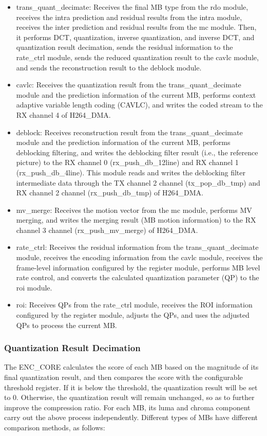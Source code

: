 \documentclass[main\_\_EN.tex]{subfiles}
\begin{document}
\begin{itemize}
    \item trans\_quant\_decimate: Receives the final MB type from the rdo module, receives the intra prediction and residual results from the intra module, receives the inter prediction and residual results from the mc module. Then, it performs DCT, quantization, inverse quantization, and inverse DCT, and quantization result decimation, sends the residual information to the rate\_ctrl module, sends the reduced quantization result to the cavlc module, and sends the reconstruction result to the deblock module.
    \item cavlc: Receives the quantization result from the trans\_quant\_decimate module and the prediction information of the current MB, performs context adaptive variable length coding (CAVLC), and writes the coded stream to the RX channel 4 of H264\_DMA.
    \item deblock: Receives reconstruction result from the trans\_quant\_decimate module and the prediction information of the current MB, performs deblocking filtering, and writes the deblocking filter result (i.e., the reference picture) to the RX channel 0 (rx\_push\_db\_12line) and RX channel 1 (rx\_push\_db\_4line). This module reads and writes the deblocking filter intermediate data through the TX channel 2 channel (tx\_pop\_db\_tmp) and RX channel 2 channel (rx\_push\_db\_tmp) of H264\_DMA.
    \item mv\_merge: Receives the motion vector from the mc module, performs MV merging, and writes the merging result (MB motion information) to the RX channel 3 channel (rx\_push\_mv\_merge) of H264\_DMA.
    \item rate\_ctrl: Receives the residual information from the trans\_quant\_decimate module, receives the encoding information from the cavlc module, receives the frame-level information configured by the register module, performs MB level rate control, and converts the calculated quantization parameter (QP) to the roi module.
    \item roi: Receives QPs from the rate\_ctrl module, receives the ROI information configured by the register module, adjusts the QPs, and uses the adjusted QPs to process the current MB.
\end{itemize}


\subsubsection{Quantization Result Decimation}\label{sec:h264-decimate}
The ENC\_CORE calculates the score of each MB based on the magnitude of its final quantization result, and then compares the score with the configurable threshold register. If it is below the threshold, the quantization result will be set to 0. Otherwise, the quantization result will remain unchanged, so as to further improve the compression ratio. For each MB, its luma and chroma component carry out the above process independently. Different types of MBs have different comparison methods, as follows:
\end{document}
